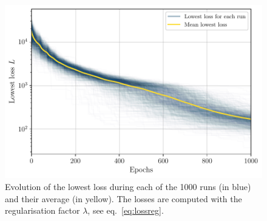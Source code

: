 \documentclass[11pt,a4paper]{article}
\begin{document}
	\begin{figure}
		\centering
		\includegraphics[scale=0.75]{Figures/Loss_all_ASMC_1000runs_13.pdf}
		\caption{Evolution of the lowest loss during each of the 1000 runs (in blue) and their average (in yellow). The losses are computed with the regularisation factor $\lambda$, see eq.~\eqref{eq:lossreg}.}
		\label{fig:lossallASMC}
	\end{figure}
\end{document}
